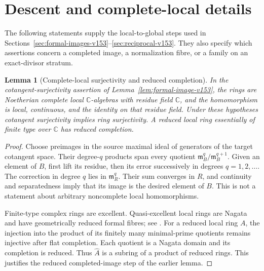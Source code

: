 \documentclass[11pt,reqno]{amsart}
\numberwithin{equation}{section}
\newtheorem{lemma}[theorem]{Lemma}
\theoremstyle{definition}\newtheorem{definition}[theorem]{Definition}
\theoremstyle{remark}\newtheorem{remark}[theorem]{Remark}
\newcommand{\C}{\mathbb C}\newcommand{\Q}{\mathbb Q}
\begin{document}
\section{Descent and complete-local details}
\label{sec:formal-details-v154}
The following statements supply the local-to-global steps used in
Sections~\ref{sec:formal-images-v153}--\ref{sec:reciprocal-v153}.
They also specify which assertions concern a completed image, a
normalization fibre, or a family on an exact-divisor stratum.

\begin{lemma}[Complete-local surjectivity and reduced completion]
\label{lem:complete-local-v154}
In the cotangent-surjectivity assertion of
Lemma~\ref{lem:formal-image-v153}, the rings are Noetherian complete
local $\C$-algebras with residue field $\C$, and the homomorphism
is local, continuous, and the identity on that residue field. Under
these hypotheses cotangent surjectivity implies ring surjectivity.
A reduced local ring essentially of finite type over $\C$ has
reduced completion.
\end{lemma}
\begin{proof}
Choose preimages in the source maximal ideal of generators of the
target cotangent space. Their degree-$q$ products span every quotient
$\mathfrak m_B^q/\mathfrak m_B^{q+1}$. Given an element of $B$, first
lift its residue, then its error successively in degrees $q=1,2,\ldots$.
The correction in degree $q$ lies in $\mathfrak m_R^q$. Their sum
converges in $R$, and continuity and separatedness imply that its
image is the desired element of $B$. This is not a statement about
arbitrary noncomplete local homomorphisms.

Finite-type complex rings are excellent. Quasi-excellent local
rings are Nagata and have geometrically reduced formal fibres;
see \cite[Tags 07QV and 0BJ0]{StacksLocalV154}. For a reduced local
ring $A$, the injection into the product of its finitely many
minimal-prime quotients remains injective after flat completion.
Each quotient is a Nagata domain and its completion is reduced.
Thus $\widehat A$ is a subring of a product of reduced rings.
This justifies the reduced completed-image step of the earlier lemma.
\end{proof}
\end{document}
